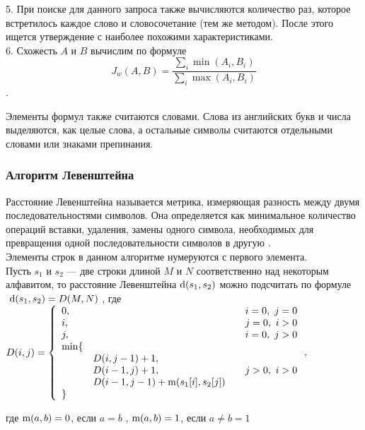 \documentclass[12pt]{article}
\begin{document}
5. При поиске для данного запроса также вычисляются количество раз, которое встретилось каждое слово и словосочетание (тем же методом). После этого ищется утверждение с наиболее похожими характеристиками.\\

6. Схожесть $A$ и $B$ вычислим по формуле   $$J_w(A,B)=\dfrac{\sum_{i} \min(A_i,B_i)}{\sum _{i} \max(A_i,B_i)}$$. 

Элементы формул также считаются словами.  Слова из английских букв и числа выделяются, как целые слова, а остальные символы считаются отдельными словами или знаками препинания.

\newpage
\subsubsection{Алгоритм Левенштейна}

Расстояние Левенштейна называется метрика, измеряющая разность между двумя последовательностями символов. Она определяется как минимальное количество операций вставки, удаления, замены одного символа, необходимых для превращения одной последовательности символов в другую .  \\

Элементы строк в данном алгоритме нумеруются с первого элемента.\\

Пусть ${\displaystyle s_{1}}$ и ${\displaystyle s_{2}}$ — две строки длиной ${\displaystyle M}$ и ${\displaystyle N}$ соответственно над некоторым алфавитом, то расстояние Левенштейна ${\displaystyle {\rm {d}}(s_{1},s_{2})}$ можно подсчитать по формуле \\

 ${\displaystyle \ {\rm {d}}(s_{1},s_{2})=D(M,N)}$ , где \\

 ${\displaystyle D(i,j)=\left\{{\begin{array}{llcl}0,&&&i=0,\ j=0\\i,&&&j=0,\ i>0\\j,&&&i=0,\ j>0\\\min\{\\&D(i,j-1)+1,\\&D(i-1,j)+1,&&j>0,\ i>0\\&D(i-1,j-1)+{\rm {m}}(s_{1}[i],s_{2}[j])\\\}\end{array}}\right.}$,

где  ${\displaystyle {\rm {m}}(a,b)}=0$, если ${\displaystyle a=b}$ , ${\displaystyle {\rm {m}}(a,b)}=1$, если ${\displaystyle a \neq b}=1$ 
\end{document}

